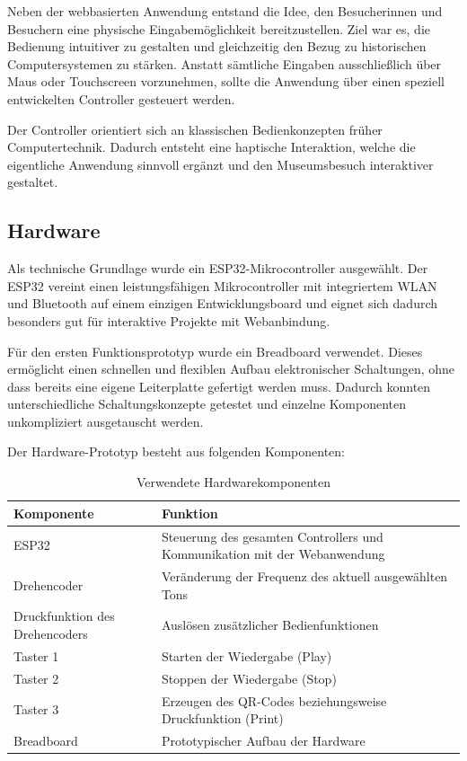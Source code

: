 Neben der webbasierten Anwendung entstand die Idee, den Besucherinnen und Besuchern
eine physische Eingabemöglichkeit bereitzustellen. Ziel war es, die Bedienung intuitiver
zu gestalten und gleichzeitig den Bezug zu historischen Computersystemen zu stärken.
Anstatt sämtliche Eingaben ausschließlich über Maus oder Touchscreen vorzunehmen,
sollte die Anwendung über einen speziell entwickelten Controller gesteuert werden.

Der Controller orientiert sich an klassischen Bedienkonzepten früher Computertechnik.
Dadurch entsteht eine haptische Interaktion, welche die eigentliche Anwendung sinnvoll
ergänzt und den Museumsbesuch interaktiver gestaltet.

\subsection{Hardware}

Als technische Grundlage wurde ein ESP32-Mikrocontroller ausgewählt. Der ESP32
vereint einen leistungsfähigen Mikrocontroller mit integriertem WLAN und Bluetooth auf
einem einzigen Entwicklungsboard und eignet sich dadurch besonders gut für interaktive
Projekte mit Webanbindung.

Für den ersten Funktionsprototyp wurde ein Breadboard verwendet. Dieses ermöglicht
einen schnellen und flexiblen Aufbau elektronischer Schaltungen, ohne dass bereits eine
eigene Leiterplatte gefertigt werden muss. Dadurch konnten unterschiedliche
Schaltungskonzepte getestet und einzelne Komponenten unkompliziert ausgetauscht
werden.

Der Hardware-Prototyp besteht aus folgenden Komponenten:

\begin{table}[H]
\centering
\begin{tabular}{|p{5cm}|p{9cm}|}
\hline
\textbf{Komponente} & \textbf{Funktion} \\ \hline
ESP32 &
Steuerung des gesamten Controllers und Kommunikation mit der Webanwendung \\ \hline

Drehencoder &
Veränderung der Frequenz des aktuell ausgewählten Tons \\ \hline

Druckfunktion des Drehencoders &
Auslösen zusätzlicher Bedienfunktionen \\ \hline

Taster 1 &
Starten der Wiedergabe (Play) \\ \hline

Taster 2 &
Stoppen der Wiedergabe (Stop) \\ \hline

Taster 3 &
Erzeugen des QR-Codes beziehungsweise Druckfunktion (Print) \\ \hline

Breadboard &
Prototypischer Aufbau der Hardware \\ \hline
\end{tabular}
\caption{Verwendete Hardwarekomponenten}
\end{table}

